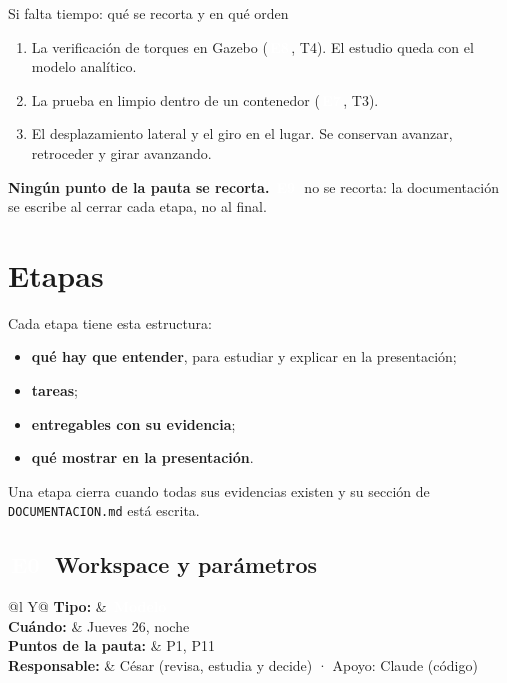 \documentclass[11pt,a4paper]{article}
\makeatletter
\newcommand{\pill}[2]{{\setlength{\fboxsep}{1.6pt}\colorbox{#1}{\textcolor{white}{\footnotesize\bfseries\,#2\,}}}}
\newcommand{\Ez}{\pill{cModelo}{E0}}
\newcommand{\Esi}{\pill{cInteg}{E7}}
\newcommand{\Eo}{\pill{cEstudio}{E8}}
\newcommand{\En}{\pill{cEntrega}{E9}}
\newcommand{\ficha}[4]{%
  \begin{tabularx}{\linewidth}{@{}l Y@{}}
  \textbf{Tipo:} & \pill{#1}{#2}\\
  \textbf{Cuándo:} & #3\\
  \textbf{Puntos de la pauta:} & #4\\
  \textbf{Responsable:} & César (revisa, estudia y decide) · Apoyo: Claude (código)\\
  \end{tabularx}\par}
\makeatother
\begin{document}
\begin{destacado}[sRojo]{Si falta tiempo: qué se recorta y en qué orden}
\begin{enumerate}
  \item La verificación de torques en Gazebo (\Eo, T4). El estudio queda con el modelo analítico.
  \item La prueba en limpio dentro de un contenedor (\Esi, T3).
  \item El desplazamiento lateral y el giro en el lugar. Se conservan avanzar, retroceder y girar avanzando.
\end{enumerate}
\textbf{Ningún punto de la pauta se recorta.} \En\ no se recorta: la documentación se escribe al cerrar cada etapa, no al final.
\end{destacado}

\section{Etapas}

Cada etapa tiene esta estructura:
\begin{itemize}
  \item \textbf{qué hay que entender}, para estudiar y explicar en la presentación;
  \item \textbf{tareas};
  \item \textbf{entregables con su evidencia};
  \item \textbf{qué mostrar en la presentación}.
\end{itemize}
Una etapa cierra cuando todas sus evidencias existen y su sección de \texttt{DOCUMENTACION.md} está escrita.

\subsection{\texorpdfstring{\Ez\ }{E0 }Workspace y parámetros}
\ficha{cModelo}{Modelo}{Jueves 26, noche}{P1, P11}
\end{document}
